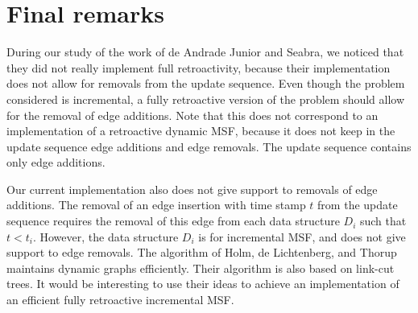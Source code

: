 \documentclass[3p,times,procedia]{elsarticle}
\begin{document}
\section{Final remarks}\label{sec:final}

During our study of the work of de Andrade Junior and Seabra, we noticed that
they did not really implement full retroactivity, because their implementation
does not allow for removals from the update sequence.  Even though the problem
considered is incremental, a fully retroactive version of the problem should
allow for the removal of edge additions.  Note that this does not correspond
to an implementation of a retroactive dynamic MSF, because it does not keep
in the update sequence edge additions and edge removals.  The update sequence
contains only edge additions.

Our current implementation also does not give support to removals of edge additions.
The removal of an edge insertion with time stamp $t$ from the update sequence 
requires the removal of this edge from each data structure $D_i$ such that $t < t_i$. 
However, the data structure $D_i$ is for incremental MSF, and does not give support 
to edge removals. 
The algorithm of Holm, de Lichtenberg, and Thorup~\cite{HolmLT2001} maintains
dynamic graphs efficiently.  Their algorithm is also based on link-cut trees.
It would be interesting to use their ideas to achieve an implementation of
an efficient fully retroactive incremental MSF.



\end{document}
